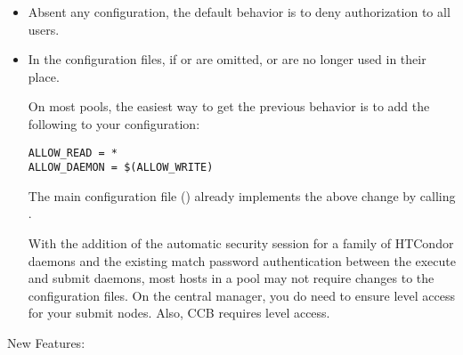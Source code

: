 \begin{itemize}

\item Absent any configuration, the default behavior is to deny authorization
to all users.

\item In the configuration files, if  or
 are omitted,  or
 are no longer used in their place.

On most pools, the easiest way to get the previous behavior is to add the
following to your configuration:

\begin{verbatim}
ALLOW_READ = *
ALLOW_DAEMON = $(ALLOW_WRITE)
\end{verbatim}

The main configuration file () already
implements the above change by calling .

With the addition of the automatic security session for a family of HTCondor
daemons and the existing match password authentication between the execute
and submit daemons, most hosts in a pool may not require changes to the
configuration files.
On the central manager, you do need to ensure  level access
for your submit nodes.
Also, CCB requires  level access.

\end{itemize}

\noindent New Features:

